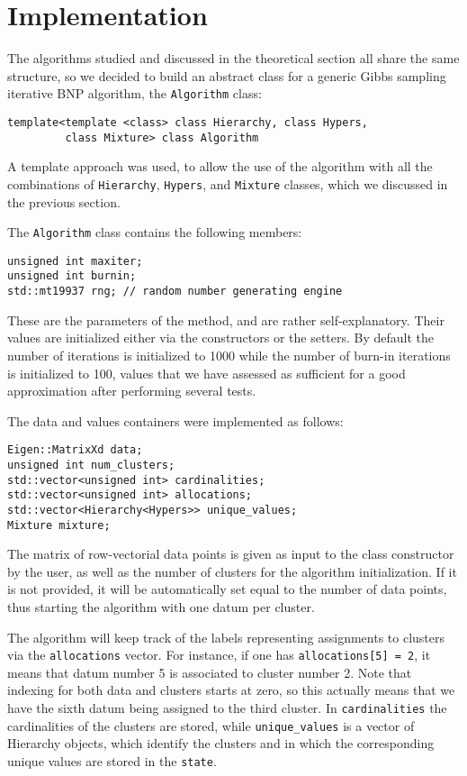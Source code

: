 \chapter{Implementation}

The algorithms studied and discussed in the theoretical section all share the same structure, so we decided to build an abstract class for a generic Gibbs sampling iterative BNP algorithm, the \verb|Algorithm| class:
\begin{verbatim}
template<template <class> class Hierarchy, class Hypers,
         class Mixture> class Algorithm
\end{verbatim}
A template approach was used, to allow the use of the algorithm with all the combinations of \verb|Hierarchy|, \verb|Hypers|, and \verb|Mixture| classes, which we discussed in the previous section.



The \verb|Algorithm| class contains the following members:
\begin{verbatim}
unsigned int maxiter;
unsigned int burnin;
std::mt19937 rng; // random number generating engine
\end{verbatim}
These are the parameters of the method, and are rather self-explanatory.
Their values are initialized either via the constructors or the setters.
By default the number of iterations is initialized to 1000 while the number of burn-in iterations is initialized to 100, values that we have assessed as sufficient for a good approximation after performing several tests.

The data and values containers were implemented as follows:
\begin{verbatim}
Eigen::MatrixXd data;
unsigned int num_clusters;
std::vector<unsigned int> cardinalities;
std::vector<unsigned int> allocations;
std::vector<Hierarchy<Hypers>> unique_values;
Mixture mixture;
\end{verbatim}

The matrix of row-vectorial data points is given as input to the class constructor by the user, as well as the number of clusters for the algorithm initialization. If it is not provided, it will be automatically set equal to the number of data points, thus starting the algorithm with one datum per cluster.

The algorithm will keep track of the labels representing assignments to clusters via the \verb|allocations| vector.
For instance, if one has \verb|allocations[5] = 2|, it means that datum number 5 is associated to cluster number 2.
Note that indexing for both data and clusters starts at zero, so this actually means that we have the sixth datum being assigned to the third cluster. 
In \verb|cardinalities| the cardinalities of the clusters are stored, while \verb|unique_values| is a vector of Hierarchy objects, which identify the clusters and in which the corresponding unique values are stored in the \verb|state|.

